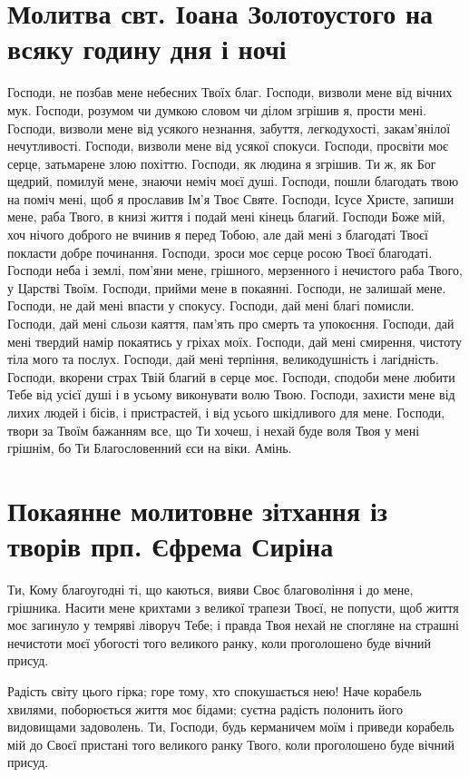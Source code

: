 \documentclass[chapters.tex]{subfiles}
\begin{document}
\section{Молитва свт. Іоана Золотоустого на всяку годину дня і ночі}
Господи, не позбав мене небесних Твоїх благ. Господи, визволи мене від вічних мук. Господи, розумом чи думкою словом чи ділом згрішив я, прости мені. Господи, визволи мене від усякого незнання, забуття, легкодухості, закам’янілої нечутливості. Господи, визволи мене від усякої спокуси. Господи, просвіти моє серце, затьмарене злою похіттю. Господи, як людина я згрішив. Ти ж, як Бог щедрий, помилуй мене, знаючи неміч моєї душі. Господи, пошли благодать твою на поміч мені, щоб я прославив Ім’я Твоє Святе. Господи, Ісусе Христе, запиши мене, раба Твого, в книзі життя і подай мені кінець благий. Господи Боже мій, хоч нічого доброго не вчинив я перед Тобою, але дай мені з благодаті Твоєї покласти добре починання. Господи, зроси моє серце росою Твоєї благодаті. Господи неба і землі, пом’яни мене, грішного, мерзенного і нечистого раба Твого, у Царстві Твоїм. Господи, прийми мене в покаянні. Господи, не залишай мене. Господи, не дай мені впасти у спокусу. Господи, дай мені благі помисли. Господи, дай мені сльози каяття, пам’ять про смерть та упокоєння. Господи, дай мені твердий намір покаятись у гріхах моїх. Господи, дай мені смирення, чистоту тіла мого та послух. Господи, дай мені терпіння, великодушність і лагідність. Господи, вкорени страх Твій благий в серце моє. Господи, сподоби мене любити Тебе від усієї душі і в усьому виконувати волю Твою. Господи, захисти мене від лихих людей і бісів, і пристрастей, і від усього шкідливого для мене. Господи, твори за Твоїм бажанням все, що Ти хочеш, і нехай буде воля Твоя у мені грішнім, бо Ти Благословенний єси на віки. Амінь.

\section{Покаянне молитовне зітхання із творів прп. Єфрема Сиріна}
Ти, Кому благоугодні ті, що каються, вияви Своє благовоління і до мене, грішника. Насити мене крихтами з великої трапези Твоєї, не попусти, щоб життя моє загинуло у темряві ліворуч Тебе; і правда Твоя нехай не спогляне на страшні нечистоти моєї убогості того великого ранку, коли проголошено буде вічний присуд.

Радість світу цього гірка; горе тому, хто спокушається нею! Наче корабель хвилями, поборюється життя моє бідами; суєтна радість полонить його видовищами задоволень. Ти, Господи, будь керманичем моїм і приведи корабель мій до Своєї пристані того великого ранку Твого, коли проголошено буде вічний присуд.
\end{document}
